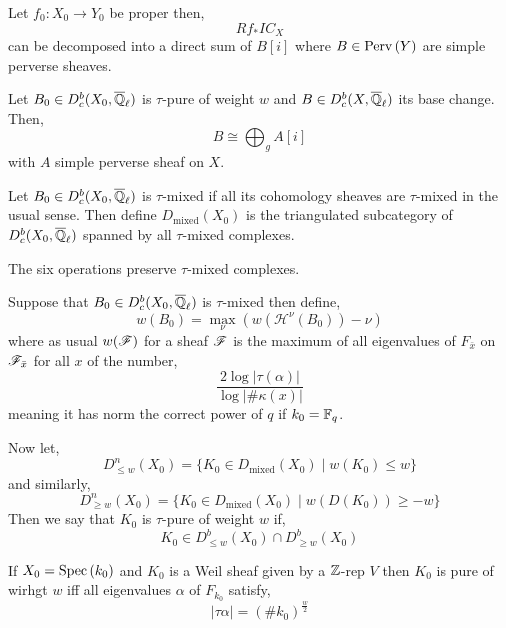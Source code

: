 \documentclass[12pt]{article}
\begin{document}
\begin{theorem}
Let $f_0 : X_0 \to Y_0$ be proper then,
\[ R f_* IC_X \]
can be decomposed into a direct sum of $B[i]$ where $B \in \mathrm{Perv}\left( Y \right)$ are simple perverse sheaves.
\end{theorem}

\newcommand{\Qbar}{\overline{\Q}}

\begin{thm}[Gabber]
Let $B_0 \in D^b_c(X_0, \Qbar_\ell)$ is $\tau$-pure of weight $w$ and $B \in D^b_c(X, \Qbar_\ell)$ its base change. Then,
\[ B \cong \bigoplus_{g} A[i] \]
with $A$ simple perverse sheaf on $X$.
\end{thm}

\begin{defn}
Let $B_0 \in D^b_c(X_0, \Qbar_\ell)$ is $\tau$-mixed if all its cohomology sheaves are $\tau$-mixed in the usual sense. Then define $D_{\text{mixed}}(X_0)$ is the triangulated subcategory of $D^b_c(X_0, \Qbar_\ell)$ spanned by all $\tau$-mixed complexes.
\end{defn}

\begin{rmk}
The six operations preserve $\tau$-mixed complexes.
\end{rmk}

\begin{defn}
Suppose that $B_0 \in D^b_c(X_0, \Qbar_\ell)$ is $\tau$-mixed then define,
\[ w(B_0) = \max_{\nu} \left( w(\mathcal{H}^\nu(B_0)) - \nu \right) \]
where as usual $w(\mathscr{F})$ for a sheaf $\mathscr{F}$ is the maximum of all eigenvalues of $F_{\bar{x}}$ on $\mathscr{F}_{\bar{x}}$ for all $x$ of the number,
\[ \frac{2\log{|\tau(\alpha)|}}{\log{|\# \kappa(x)|}} \]
meaning it has norm the correct power of $q$ if $k_0 = \mathbb{F}_q$.
\end{defn}

\begin{defn}
Now let,
\[ D^n_{\le w}(X_0) = \{ K_0 \in D_{\text{mixed}}(X_0) \mid w(K_0) \le w \} \]
and similarly,
\[ D^n_{\ge w}(X_0) = \{ K_0 \in D_{\text{mixed}}(X_0) \mid w(D(K_0)) \ge - w \} \]
Then we say that $K_0$ is $\tau$-pure of weight $w$ if,
\[ K_0 \in D^b_{\le w}(X_0) \cap D^b_{\ge w}(X_0) \]
\end{defn}

\begin{rmk}
If $X_0 = \mathrm{Spec}\left( k_0 \right)$ and $K_0$ is a Weil sheaf given by a $\mathbb{Z}$-rep $V$ then $K_0$ is pure of wirhgt $w$ iff all eigenvalues $\alpha$ of $F_{k_0}$ satisfy,
\[ | \tau \alpha| = (\# k_0)^{\frac{w}{2}} \]
\end{rmk}
\end{document}

